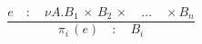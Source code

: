 \begin{equation}
\frac { e\quad :\quad \nu A .B_{ 1 }\, \times \, B_{ 2 }\, \times \quad \dots \quad \times B_{ n } }{ \pi _{ i }\, (e)\quad :\quad B_{ i } }
\end{equation}